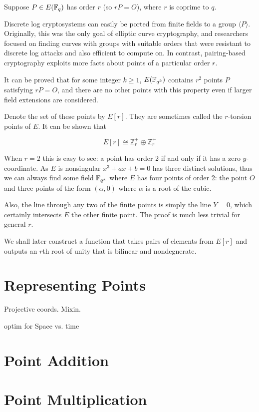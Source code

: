 Suppose $P\in E(\mathbb{F}_q)$ has order $r$ (so $r P = O$),
where $r$ is coprime to $q$.

Discrete log cryptosystems can easily be ported from finite fields
to a group $\langle P \rangle$.
Originally, this was the only goal of elliptic curve cryptography,
and researchers focused on finding curves with groups with
suitable orders that were resistant to discrete log attacks and also
efficient to compute on.
In contrast, pairing-based cryptography exploits more facts
about points of a particular order $r$.

It can be proved that for some integer $k \ge 1$,
$E(\mathbb{F}_{q^k})$ contains $r^2$ points $P$ satisfying $r P = O$,
and there are no other points with this property even if larger field
extensions are considered.

Denote the set of these points by $E[r]$. They are sometimes called the
$r$-torsion points of $E$. It can be shown that

\[ E[r] \cong \mathbb{Z}_r^+ \oplus \mathbb{Z}_r^+ \]

When $r=2$ this is easy to see: a point has order 2 if and only if it has
a zero $y$-coordinate. As $E$ is nonsingular
$x^3 + ax + b = 0$ has three distinct solutions, thus we can always find
some field $\mathbb{F}_{q^k}$ where $E$ has
four points of order 2: the point $O$ and three points of the form
$(\alpha, 0)$ where $\alpha$ is a root of the cubic.

Also, the line through any two of the finite points is simply the line $Y = 0$,
which certainly intersects $E$ the other finite point.
The proof is much less trivial for general $r$.

We shall later construct a function
that takes pairs of elements from $E[r]$ and outputs an $r$th root of unity
that is bilinear and nondegnerate.

\section {Representing Points}

Projective coords. Mixin.

optim for Space vs. time

\section {Point Addition}

\section {Point Multiplication}

